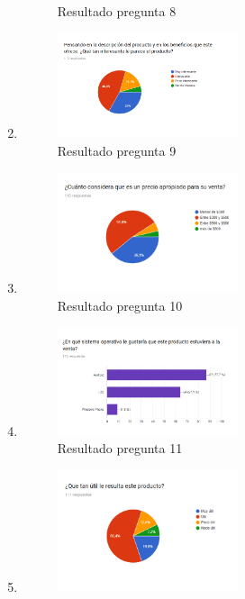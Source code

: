 \begin{enumerate}
\begin{figure}[H]
	\caption{Resultado pregunta 8}
\end{figure}
\item \begin{figure}[H]
	\centering
	\includegraphics[width=0.5\textwidth]{Apendice2/img/Interesante}
	\caption{Resultado pregunta 9}
\end{figure}
\item \begin{figure}[H]
	\centering
	\includegraphics[width=0.5\textwidth]{Apendice2/img/Precio}
	\caption{Resultado pregunta 10}
\end{figure}
\item \begin{figure}[H]
	\centering
	\includegraphics[width=0.5\textwidth]{Apendice2/img/SO}
	\caption{Resultado pregunta 11}
\end{figure}
\item \begin{figure}[H]
	\centering
	\includegraphics[width=0.5\textwidth]{Apendice2/img/Util}

\end{figure}
\end{enumerate}
